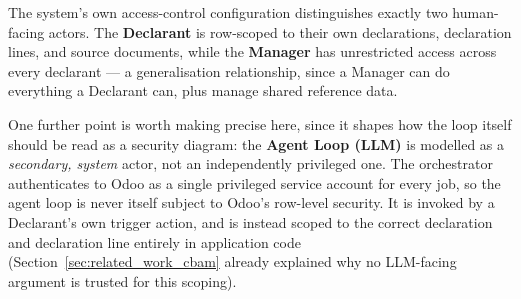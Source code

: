 The system's own access-control configuration distinguishes exactly two
human-facing actors. The \textbf{Declarant} is row-scoped to their own
declarations, declaration lines, and source documents, while the
\textbf{Manager} has unrestricted access across every declarant --- a
generalisation relationship, since a Manager can do everything a
Declarant can, plus manage shared reference data.

One further point is worth making precise here, since it shapes how the
loop itself should be read as a security diagram: the \textbf{Agent Loop
(LLM)} is modelled as a \textit{secondary, system} actor, not an
independently privileged one. The orchestrator authenticates to Odoo as a
single privileged service account for every job, so the agent loop is
never itself subject to Odoo's row-level security. It is invoked by a
Declarant's own trigger action, and is instead scoped to the correct
declaration and declaration line entirely in application code
(Section~\ref{sec:related_work_cbam} already explained why no LLM-facing
argument is trusted for this scoping).

